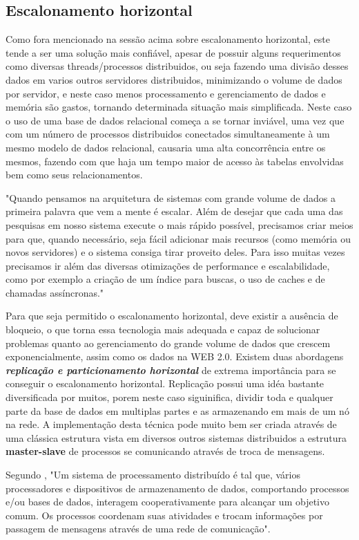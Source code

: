 \subsection{ Escalonamento horizontal }
Como fora mencionado na sessão acima sobre escalonamento horizontal, este tende a ser uma solução mais confiável, apesar de possuir alguns requerimentos como diversas threads/processos distribuidos, ou seja fazendo uma divisão desses dados em varios outros servidores distribuidos, minimizando o volume de dados por servidor, 
e neste caso menos processamento e gerenciamento de dados e memória são gastos, tornando determinada situação mais simplificada. Neste caso o uso de uma base de dados relacional começa a se tornar inviável, uma vez que com um número de processos distribuidos conectados simultaneamente à um mesmo modelo de dados relacional, 
causaria uma alta concorrência entre os mesmos, fazendo com que haja um tempo maior de acesso às tabelas envolvidas bem como seus relacionamentos. 

"Quando pensamos na arquitetura de sistemas com grande volume de dados a primeira palavra que vem a mente é escalar. Além de desejar que cada uma das pesquisas em nosso sistema execute o mais rápido possível, precisamos criar meios para que, quando necessário, seja fácil adicionar mais recursos (como memória ou novos servidores) e o sistema consiga tirar proveito deles. Para isso muitas vezes precisamos ir além das diversas otimizações de performance e escalabilidade, como por exemplo a criação de um índice para buscas, o uso de caches e de chamadas assíncronas." \cite{ALMEIDA,SILVEIRA}

Para que seja permitido o escalonamento horizontal, deve existir a ausência de bloqueio, o que torna essa tecnologia mais adequada e capaz de solucionar problemas quanto ao gerenciamento do grande volume de dados que crescem exponencialmente, assim como os dados na WEB 2.0. Existem duas abordagens \textit{\textbf{replicação e particionamento horizontal}} de extrema importância para se conseguir o escalonamento horizontal. Replicação possui uma idéa bastante diversificada por muitos, porem
 neste caso siguinifica, dividir toda e qualquer parte da base de dados em multiplas partes e as armazenando em mais de um nó na rede. A implementação desta técnica pode muito bem ser criada através de uma clássica estrutura vista em diversos outros sistemas distribuidos
a estrutura \textbf{master-slave} de processos se comunicando através de troca de mensagens. 

Segundo \cite{SLOMAN}, "Um sistema de processamento distribuído é tal que, vários  processadores e dispositivos de  armazenamento de dados,  comportando processos e/ou bases de  dados, interagem cooperativamente  para alcançar um objetivo comum. Os  processos coordenam suas atividades e  trocam informações por passagem de  mensagens através de uma rede de comunicação".

